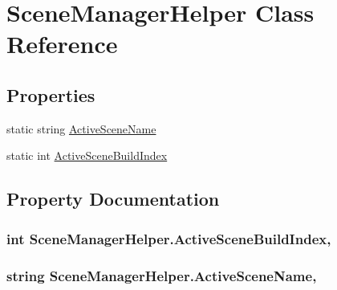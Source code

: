 \hypertarget{class_scene_manager_helper}{}\section{Scene\+Manager\+Helper Class Reference}
\label{class_scene_manager_helper}
\subsection*{Properties}
\begin{DoxyCompactItemize}
\item 
static string \hyperlink{class_scene_manager_helper_a177df3595c98493f06aeec0aca449743}{Active\+Scene\+Name}
\item 
static int \hyperlink{class_scene_manager_helper_ab6409a5985d706aa80a8c1add2f88cad}{Active\+Scene\+Build\+Index}
\end{DoxyCompactItemize}


\subsection{Property Documentation}
\subsubsection[{\texorpdfstring{Active\+Scene\+Build\+Index}{ActiveSceneBuildIndex}}]{\setlength{\rightskip}{0pt plus 5cm}int Scene\+Manager\+Helper.\+Active\+Scene\+Build\+Index\hspace{0.3cm}{\ttfamily [static]}, {\ttfamily [get]}}\hypertarget{class_scene_manager_helper_ab6409a5985d706aa80a8c1add2f88cad}{}\label{class_scene_manager_helper_ab6409a5985d706aa80a8c1add2f88cad}
\subsubsection[{\texorpdfstring{Active\+Scene\+Name}{ActiveSceneName}}]{\setlength{\rightskip}{0pt plus 5cm}string Scene\+Manager\+Helper.\+Active\+Scene\+Name\hspace{0.3cm}{\ttfamily [static]}, {\ttfamily [get]}}\hypertarget{class_scene_manager_helper_a177df3595c98493f06aeec0aca449743}{}\label{class_scene_manager_helper_a177df3595c98493f06aeec0aca449743}



